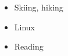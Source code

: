 \documentclass[line,margin]{res}
\begin{document}
\begin{resume}
		\begin{itemize}
			\item Skiing, hiking
			\item Linux
			\item Reading
		\end{itemize}

 

\end{resume}
\end{document}
